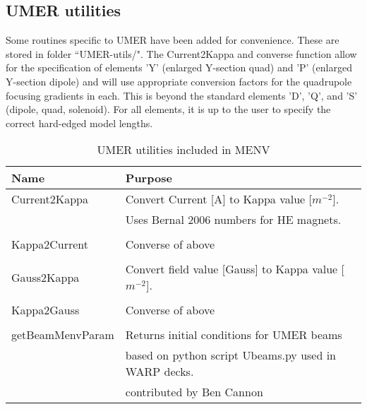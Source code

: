 \documentclass[../menv_main.tex]{subfiles}
\begin{document}
\subsection{UMER utilities}

Some routines specific to UMER have been added for convenience. These are stored in folder ``UMER-utils/". The Current2Kappa and converse function allow for the specification of elements 'Y' (enlarged Y-section quad) and 'P' (enlarged Y-section dipole) and will use appropriate conversion factors for the quadrupole focusing gradients in each. This is beyond the standard elements 'D', 'Q', and 'S' (dipole, quad, solenoid). For all elements, it is up to the user to specify the correct hard-edged model lengths. 

\begin{table}[htb]
\centering
\caption{UMER utilities included in MENV}
\label{tab:menv-umer}
\vspace{10pt}
\begin{tabularx}{\textwidth}{l X}
\hline
 Name & Purpose \\
\hline
Current2Kappa 	& Convert Current [A] to Kappa value [$m^{-2}$]. \\
				& Uses Bernal 2006 numbers for HE magnets. \\ 
				& \\
Kappa2Current 	& Converse of above \\ 
				& \\
Gauss2Kappa 	& Convert field value [Gauss] to Kappa value [$m^{-2}$]. \\ 
				& \\
Kappa2Gauss 	& Converse of above \\ 
				& \\
getBeamMenvParam& Returns initial conditions for UMER beams\\
				& based on python script Ubeams.py used in WARP decks. \\
				& contributed by Ben Cannon \\
\hline
\end{tabularx}
\end{table}
\end{document}
